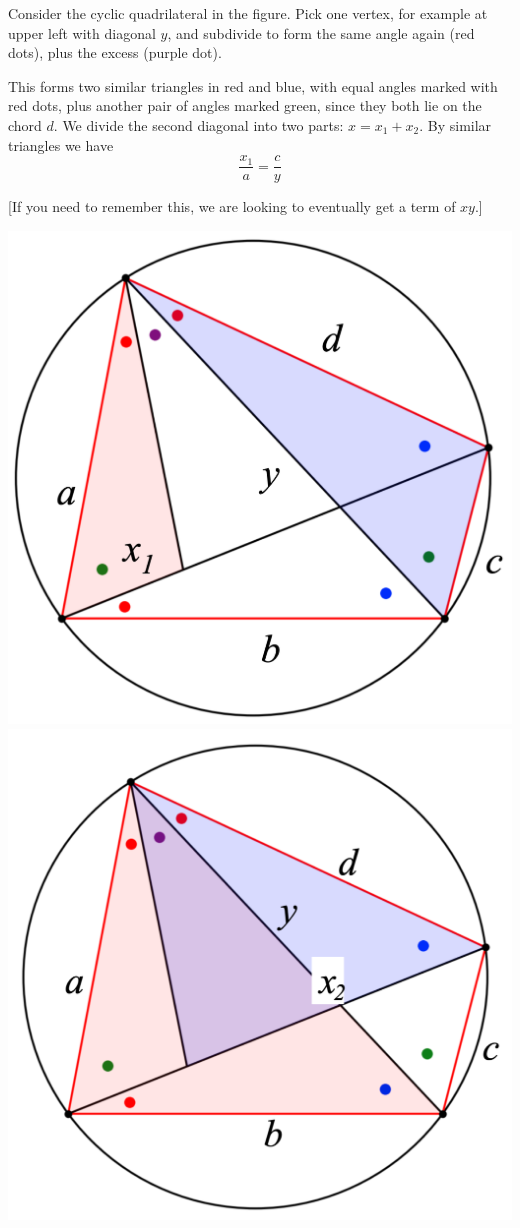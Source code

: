 \documentclass[11pt, oneside]{article}
\begin{document}
Consider the cyclic quadrilateral in the figure.  Pick one vertex, for example at upper left with diagonal $y$, and subdivide to form the same angle again (red dots), plus the excess (purple dot).

This forms two similar triangles in red and blue, with equal angles marked with red dots, plus another pair of angles marked green, since they both lie on the chord $d$.  We divide the second diagonal into two parts:  $x = x_1 + x_2$.  By similar triangles we have
\[ \frac{x_1}{a} = \frac{c}{y} \]

[If you need to remember this, we are looking to eventually get a term of $xy$.]

\begin{center} \includegraphics [scale=0.25] {ptolemy_angles1.png} \includegraphics [scale=0.25] {ptolemy_angles2.png} \end{center}
\end{document}
